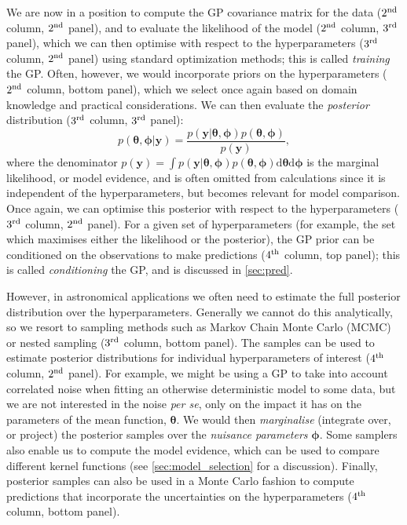 \documentclass[letterpaper]{ar-1col}
\newcommand{\hyperparams}{\ensuremath{\boldsymbol{\phi}}}
\newcommand{\meanparams}{\ensuremath{\boldsymbol{\theta}}}
\begin{document}
We are now in a position to compute the GP covariance matrix for the data ($2^{\rm nd}$ column, $2^{\rm nd}$ panel), and to evaluate the likelihood of the model ($2^{\rm nd}$ column, $3^{\rm rd}$ panel), which we can then optimise with respect to the hyperparameters ($3^{\rm rd}$ column, $2^{\rm nd}$ panel) using standard optimization methods; this is called \emph{training} the GP. Often, however, we would incorporate priors on the hyperparameters ($2^{\rm nd}$ column, bottom panel), which we select once again based on domain knowledge and practical considerations. We can then evaluate the \emph{posterior} distribution ($3^{\rm rd}$ column, $3^{\rm rd}$ panel):
\begin{equation}
p(\meanparams,\hyperparams|\mathbf{y})=\frac{p(\mathbf{y}|\meanparams,\hyperparams)p(\meanparams,\hyperparams)}{p(\mathbf{y})},
\end{equation}
where the denominator $p(\mathbf{y})=\int p(\mathbf{y}|\meanparams,\hyperparams)p(\meanparams,\hyperparams) \mathrm{d}\meanparams \mathrm{d}\hyperparams$ is the marginal likelihood, or model evidence, and is often omitted from calculations since it is independent of the hyperparameters, but becomes relevant for model comparison. Once again, we can optimise this posterior with respect to the hyperparameters ($3^{\rm rd}$ column, $2^{\rm nd}$ panel). For a given set of hyperparameters (for example, the set which maximises either the likelihood or the posterior), the GP prior can be conditioned on the observations to make predictions ($4^{\rm th}$ column, top panel); this is called \emph{conditioning} the GP, and is discussed in \autoref{sec:pred}. 

However, in astronomical applications we often need to estimate the full posterior distribution over the hyperparameters. 
Generally we cannot do this analytically, so we resort to sampling methods such as Markov Chain Monte Carlo (MCMC) or nested sampling ($3^{\rm rd}$ column, bottom panel). The samples can be used to estimate posterior distributions for individual hyperparameters of interest ($4^{\rm th}$ column, $2^{\rm nd}$ panel). For example, we might be using a GP to take into account correlated noise when fitting an otherwise deterministic model to some data, but we are not interested in the noise \emph{per se}, only on the impact it has on the parameters of the mean function, $\meanparams$. We would then \emph{marginalise} (integrate over, or project) the posterior samples over the \emph{nuisance parameters} $\hyperparams$. Some samplers also enable us to compute the model evidence, which can be used to compare different kernel functions (see \autoref{sec:model_selection} for a discussion). Finally,  posterior samples can also be used in a Monte Carlo fashion to compute predictions that incorporate the uncertainties on the hyperparameters ($4^{\rm th}$ column, bottom panel).
\end{document}
